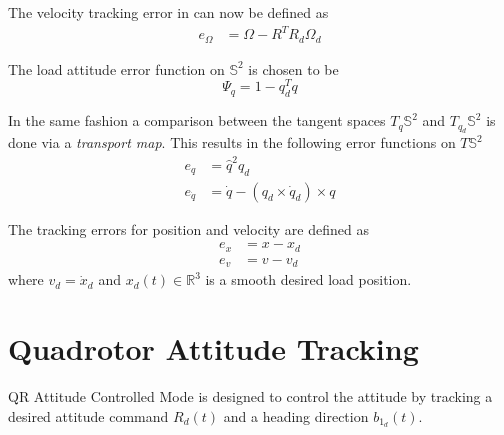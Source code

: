 %
The velocity tracking error in \BF  can now be defined as 
\begin{align}\label{key}
e_\Omega&=\Omega- R^TR_d\Omega_d
\end{align}

The load attitude error function on $ \mathbb{S}^2 $ is chosen to be 
\begin{equation}\label{eq:psiq}
\Psi_q=1-q_d^Tq
\end{equation}

In the same fashion a comparison between the tangent spaces $ T_q\mathbb{S}^2$ and $ T_{q_d}\mathbb{S}^2$ is done via a \textit{transport map}. This results in the following error functions on $ T\mathbb{S}^2 $
\begin{align}
e_q&=\hat{q}^2q_d\label{eq:con.eq}\\
e_{\dot{q}}&=\dot{q}-(q_d\times\dot{q}_d)\times q\label{eq:con.edq}
\end{align}

The tracking errors for position and velocity are defined as
\begin{align}\label{key}
e_x&=x-x_d\\
e_v&=v-v_d
\end{align}
where $ v_d=\dot{x}_d $ and $ x_d(t) \in \mathbb{R}^3$ is a smooth desired load position.

\section{Quadrotor Attitude Tracking}
QR Attitude Controlled Mode is designed to control the  attitude by tracking a desired  attitude command $ R_d(t) $ and a heading direction $ b_{1_d}(t) $. 

